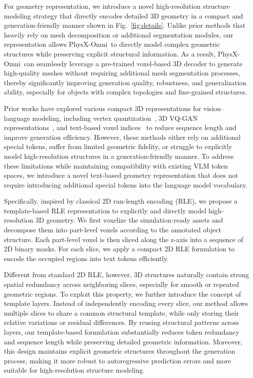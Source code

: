 \documentclass[11pt]{article}
\def\ourname{PhysX-Omni}
\begin{document}
For geometry representation, we introduce a novel high-resolution structure modeling strategy that directly encodes detailed 3D geometry in a compact and generation-friendly manner shown in Fig.~\ref{fig:details}. Unlike prior methods that heavily rely on mesh decomposition or additional segmentation modules, our representation allows \ourname\ to directly model complex geometric structures while preserving explicit structural information. As a result, \ourname\ can seamlessly leverage a pre-trained voxel-based 3D decoder to generate high-quality meshes without requiring additional mesh segmentation processes, thereby significantly improving generation quality, robustness, and generalization ability, especially for objects with complex topologies and fine-grained structures.


Prior works have explored various compact 3D representations for vision--language modeling, including vertex quantization~\cite{wang2024llama,fang2025meshllm}, 3D VQ-GAN representations~\cite{ye2025shapellm}, and text-based voxel indices~\cite{cao2025physxanything} to reduce sequence length and improve generation efficiency. However, these methods either rely on additional special tokens, suffer from limited geometric fidelity, or struggle to explicitly model high-resolution structures in a generation-friendly manner. To address these limitations while maintaining compatibility with existing VLM token spaces, we introduce a novel text-based geometry representation that does not require introducing additional special tokens into the language model vocabulary.

Specifically, inspired by classical 2D run-length encoding (RLE), we propose a template-based RLE representation to explicitly and directly model high-resolution 3D geometry. We first voxelize the simulation-ready assets and decompose them into part-level voxels according to the annotated object structure. Each part-level voxel is then sliced along the z-axis into a sequence of 2D binary masks. For each slice, we apply a compact 2D RLE formulation to encode the occupied regions into text tokens efficiently.

Different from standard 2D RLE, however, 3D structures naturally contain strong spatial redundancy across neighboring slices, especially for smooth or repeated geometric regions. To exploit this property, we further introduce the concept of template layers. Instead of independently encoding every slice, our method allows multiple slices to share a common structural template, while only storing their relative variations or residual differences. By reusing structural patterns across layers, our template-based formulation substantially reduces token redundancy and sequence length while preserving detailed geometric information. Moreover, this design maintains explicit geometric structures throughout the generation process, making it more robust to autoregressive prediction errors and more suitable for high-resolution structure modeling.
\end{document}
